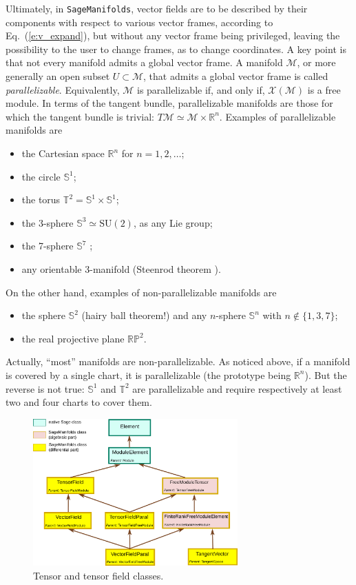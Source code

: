 \documentclass[a4paper]{jpconf}
\newcommand{\soft}[1]{\texttt{#1}}
\newcommand{\SM}{\soft{SageManifolds}}
\begin{document}
Ultimately, in \SM{}, vector fields are to be described by their 
components with respect to various vector frames, according to 
Eq.~(\ref{e:v_expand}), but without any vector frame being privileged, 
leaving the possibility to the user to change frames, as to change 
coordinates. A key point is that 
not every manifold admits a global vector frame. 
A manifold $\mathcal{M}$, or more generally an open subset $U\subset\mathcal{M}$,
that admits a global vector frame is called 
\emph{parallelizable}. Equivalently,
$\mathcal{M}$ is parallelizable if, and only if, $\mathcal{X}(\mathcal{M})$
is a free module. In terms of the tangent bundle, 
parallelizable manifolds are those for which the tangent bundle is trivial:
$T\mathcal{M} \simeq \mathcal{M}\times \mathbb{R}^n$.
Examples of parallelizable manifolds are \cite{Lee13}
\begin{itemize}
\item the Cartesian space $\mathbb{R}^n$ for $n=1,2,\ldots$; 
\item the circle $\mathbb{S}^1$; 
\item the torus $\mathbb{T}^2 = \mathbb{S}^1\times \mathbb{S}^1$;
\item the 3-sphere $\mathbb{S}^3 \simeq \mathrm{SU}(2)$, as any Lie group;
\item the 7-sphere $\mathbb{S}^7$ ; 
\item any orientable 3-manifold (Steenrod theorem \cite{Steen51}).
\end{itemize}
On the other hand, examples of non-parallelizable manifolds are
\begin{itemize}
\item the sphere $\mathbb{S}^2$ (hairy ball theorem!) and any $n$-sphere $\mathbb{S}^n$ with $n\not\in\{1,3,7\}$; 
\item the real projective plane $\mathbb{RP}^2$.
\end{itemize}
Actually, ``most'' manifolds are non-parallelizable. 
As noticed above, if a manifold is covered by a single chart, it is 
parallelizable (the prototype being $\mathbb{R}^n$). But the reverse is not 
true: $\mathbb{S}^1$ and $\mathbb{T}^2$ are parallelizable and require
respectively at least two and four charts to cover them. 

\begin{figure}
\begin{center}
\includegraphics[width=0.7\textwidth]{tensorfield_classes.pdf}
\end{center}
\caption{\label{f:tensor_classes} Tensor and tensor field classes.}
\end{figure}
\end{document}
